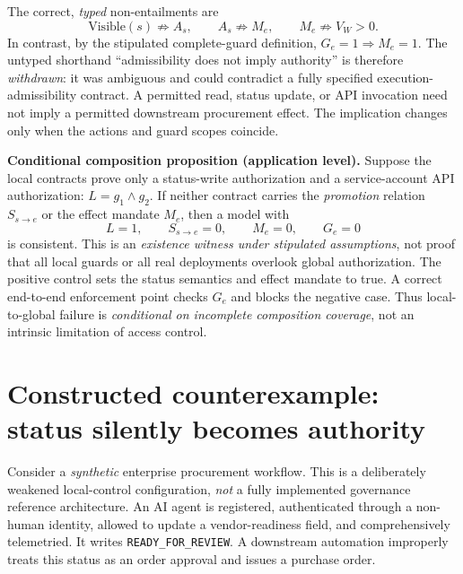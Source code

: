 \documentclass[11pt,a4paper]{article}
\begin{document}
The correct, \emph{typed} non-entailments are
\begin{equation}
\boxed{\mathrm{Visible}(s)\not\Rightarrow A_s,\qquad A_s\not\Rightarrow M_e,
\qquad M_e\not\Rightarrow V_W>0.}
\label{eq:nonequiv}
\end{equation}
In contrast, by the stipulated complete-guard definition, $G_e=1\Rightarrow M_e=1$. The untyped shorthand ``admissibility does not imply authority'' is therefore \emph{withdrawn}: it was ambiguous and could contradict a fully specified execution-admissibility contract. A permitted read, status update, or API invocation need not imply a permitted downstream procurement effect. The implication changes only when the actions and guard scopes coincide.

\textbf{Conditional composition proposition (application level).} Suppose the local contracts prove only a status-write authorization and a service-account API authorization: $L=g_1\land g_2$. If neither contract carries the \emph{promotion} relation $S_{s\to e}$ or the effect mandate $M_e$, then a model with
\begin{equation}
\boxed{L=1,\qquad S_{s\to e}=0,\qquad M_e=0,\qquad G_e=0}
\label{eq:composition}
\end{equation}
is consistent. This is an \emph{existence witness under stipulated assumptions}, not proof that all local guards or all real deployments overlook global authorization. The positive control sets the status semantics and effect mandate to true. A correct end-to-end enforcement point checks $G_e$ and blocks the negative case. Thus local-to-global failure is \emph{conditional on incomplete composition coverage}, not an intrinsic limitation of access control.

\section{Constructed counterexample: status silently becomes authority}
Consider a \emph{synthetic} enterprise procurement workflow. This is a deliberately weakened local-control configuration, \emph{not} a fully implemented governance reference architecture. An AI agent is registered, authenticated through a non-human identity, allowed to update a vendor-readiness field, and comprehensively telemetried. It writes \texttt{READY\_FOR\_REVIEW}. A downstream automation improperly treats this status as an order approval and issues a purchase order.
\end{document}
